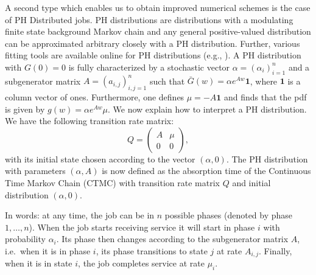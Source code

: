 \documentclass[12pt]{report}
\begin{document}
A second type which enables us to obtain improved numerical schemes is the case of PH Distributed jobs. 
PH distributions are distributions with a modulating finite state background Markov chain \cite{latouche1} and any general positive-valued distribution can be approximated arbitrary closely with a PH distribution. Further, various fitting tools are available online 
for PH distributions (e.g., \cite{panchenko1,Kriege2014}). A PH distribution with $G(0)=0$ is fully characterized by a stochastic vector $\alpha = (\alpha_i)_{i=1}^n$ and a subgenerator matrix  $A = (a_{i,j})_{i,j=1}^n$ such that $\bar G(w) = \alpha e^{Aw} \textbf{1}$, where $\textbf{1}$ is a column vector of ones. Furthermore, one defines $\mu = -A \textbf{1}$ and finds that the pdf is given by $g(w) = \alpha e^{Aw} \mu$. We now explain how to interpret a PH distribution. We have the following transition rate matrix:
$$
Q=
\begin{pmatrix}
	A & \mu\\
	0 & 0
\end{pmatrix},
$$
with its initial state chosen according to the vector $(\alpha, 0)$. The PH distribution with parameters $(\alpha, A)$ is now defined as the absorption time of the Continuous Time Markov Chain (CTMC) with transition rate matrix $Q$ and initial distribution $(\alpha, 0)$.

In words: at any time, the job can be in $n$ possible phases (denoted by phase $1, \dots, n$). When the job starts receiving service it will start in phase $i$ with probability $\alpha_i$. Its phase then changes according to the subgenerator matrix $A$, i.e.~when it is in phase $i$, its phase transitions to state $j$ at rate $A_{i,j}$. Finally, when it is in state $i$, the job completes service at rate $\mu_i$.
\end{document}
